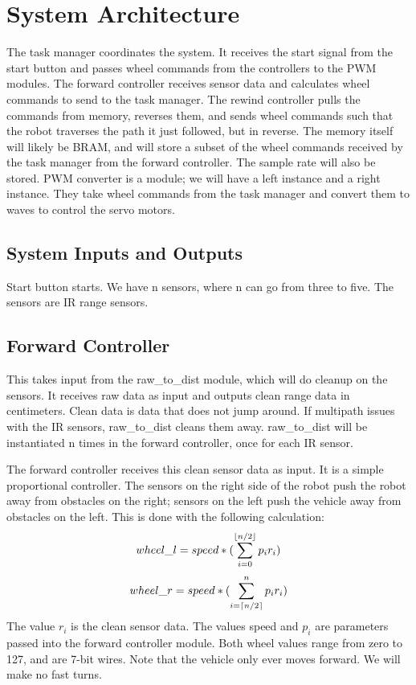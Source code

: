 \documentclass{article}
\DeclarePairedDelimiter{\ceil}{\lceil}{\rceil}
\DeclarePairedDelimiter{\floor}{\lfloor}{\rfloor}
\begin{document}
\section*{System Architecture} 
The task manager coordinates the system. It receives the start signal from the start button and passes wheel commands from the controllers to the PWM modules. 
The forward controller receives sensor data and calculates wheel commands to send to the task manager. 
The rewind controller pulls the commands from memory, reverses them, and sends wheel commands such that the robot traverses the path it just followed, but in reverse. 
The memory itself will likely be BRAM, and will store a subset of the wheel commands received by the task manager from the forward controller. The sample rate will also be stored. 
PWM converter is a module; we will have a left instance and a right instance. They take wheel commands from the task manager and convert them to waves to control the servo motors. 

\subsection*{System Inputs and Outputs}
Start button starts. 
We have n sensors, where n can go from three to five. The sensors are IR range sensors. 

\subsection*{Forward Controller}
This takes input from the raw\_to\_dist module, which will do cleanup on the sensors. It receives raw data as input and outputs clean range data in centimeters. Clean data is data that does not jump around. If multipath issues with the IR sensors, raw\_to\_dist cleans them away. raw\_to\_dist will be instantiated n times in the forward controller, once for each IR sensor. 

The forward controller receives this clean sensor data as input. It is a simple proportional controller. The sensors on the right side of the robot push the robot away from obstacles on the right; sensors on the left push the vehicle away from obstacles on the left. This is done with the following calculation: 
\begin{equation}
wheel\_l = speed * (\sum_{i=0}^{\floor{n/2}}{p_ir_i}) \end{equation}
\begin{equation}wheel\_r = speed * (\sum_{i=\ceil{n/2}}^{n}{p_ir_i})
\end{equation}
The value $r_i$ is the clean sensor data. The values speed and $p_i$ are parameters passed into the forward controller module. Both wheel values range from zero to 127, and are 7-bit wires. Note that the vehicle only ever moves forward. We will make no fast turns. 
\end{document}
